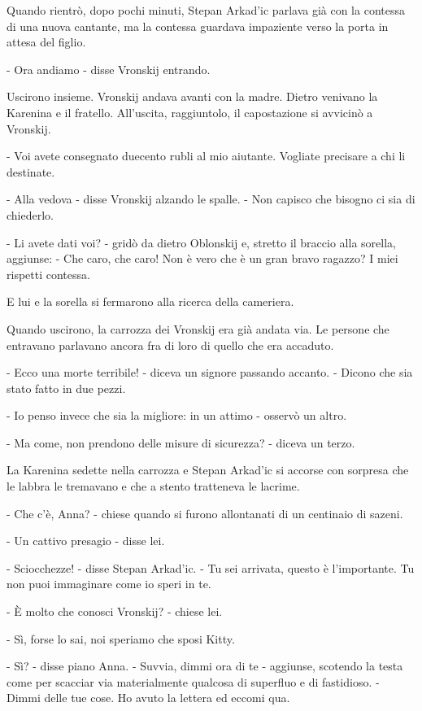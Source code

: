 Quando rientrò, dopo pochi minuti, Stepan Arkad'ic parlava già con la contessa di una nuova cantante, ma la contessa guardava impaziente verso la porta in attesa del figlio. 

- Ora andiamo - disse Vronskij entrando. 

Uscirono insieme. Vronskij andava avanti con la madre. Dietro venivano la Karenina e il fratello. All'uscita, raggiuntolo, il capostazione si avvicinò a Vronskij. 

- Voi avete consegnato duecento rubli al mio aiutante. Vogliate precisare a chi li destinate. 

- Alla vedova - disse Vronskij alzando le spalle. - Non capisco che bisogno ci sia di chiederlo. 

- Li avete dati voi? - gridò da dietro Oblonskij e, stretto il braccio alla sorella, aggiunse: - Che caro, che caro! Non è vero che è un gran bravo ragazzo? I miei rispetti contessa. 

E lui e la sorella si fermarono alla ricerca della cameriera. 

Quando uscirono, la carrozza dei Vronskij era già andata via. Le persone che entravano parlavano ancora fra di loro di quello che era accaduto. 

- Ecco una morte terribile! - diceva un signore passando accanto. - Dicono che sia stato fatto in due pezzi. 

- Io penso invece che sia la migliore: in un attimo - osservò un altro. 

- Ma come, non prendono delle misure di sicurezza? - diceva un terzo. 

La Karenina sedette nella carrozza e Stepan Arkad'ic si accorse con sorpresa che le labbra le tremavano e che a stento tratteneva le lacrime. 

- Che c'è, Anna? - chiese quando si furono allontanati di un centinaio di sazeni. 

- Un cattivo presagio - disse lei. 

- Sciocchezze! - disse Stepan Arkad'ic. - Tu sei arrivata, questo è l'importante. Tu non puoi immaginare come io speri in te. 

- È molto che conosci Vronskij? - chiese lei. 

- Sì, forse lo sai, noi speriamo che sposi Kitty. 

- Sì? - disse piano Anna. - Suvvia, dimmi ora di te - aggiunse, scotendo la testa come per scacciar via materialmente qualcosa di superfluo e di fastidioso. - Dimmi delle tue cose. Ho avuto la lettera ed eccomi qua. 

